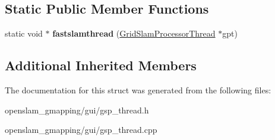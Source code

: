 \subsection*{Static Public Member Functions}
\begin{DoxyCompactItemize}
\item 
\mbox{\label{structGridSlamProcessorThread_a6aea95c0700486ccc22bc2fa1c3970c0}} 
static void $\ast$ {\bfseries fastslamthread} (\hyperlink{structGridSlamProcessorThread}{Grid\+Slam\+Processor\+Thread} $\ast$gpt)
\end{DoxyCompactItemize}
\subsection*{Additional Inherited Members}


The documentation for this struct was generated from the following files\+:\begin{DoxyCompactItemize}
\item 
openslam\+\_\+gmapping/gui/gsp\+\_\+thread.\+h\item 
openslam\+\_\+gmapping/gui/gsp\+\_\+thread.\+cpp\end{DoxyCompactItemize}
